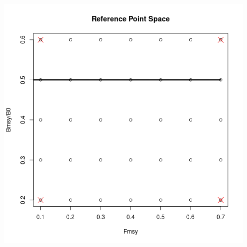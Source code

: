 \documentclass[ xcolor = pdftex, dvipsnames, table ]{beamer}
\begin{document}
{%
\begin{frame}
\begin{center}
\includegraphics[height=1\textheight]{shaeferDat.png}
\end{center}
\end{frame}
}
\end{document}
